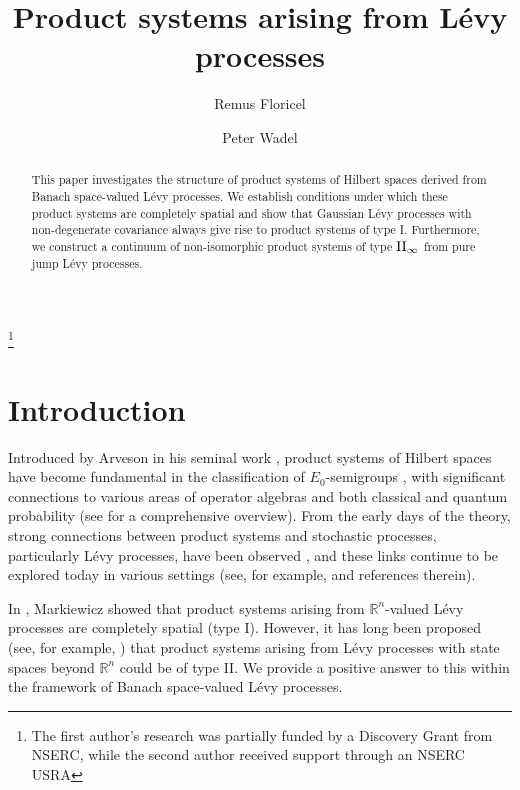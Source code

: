 \documentclass[11pt]{amsart}
\theoremstyle{definition}
\theoremstyle{remark}
\numberwithin{equation}{section}
\begin{document}
\title{Product systems arising from L\'evy processes}

\author{Remus Floricel}
\author{Peter Wadel}
\address{University of Regina, Department of Mathematics and Statistics, Regina, SK, Canada}
\address{University of Waterloo, Faculty of Mathematics, Waterloo, ON, Canada}
\thanks{The first author's research was partially funded by a Discovery Grant from NSERC, while the second author received support through an NSERC USRA}

\begin{abstract}
This paper investigates the structure of product systems of Hilbert spaces derived from Banach space-valued L\'evy processes. We establish conditions under which these product systems are completely spatial and show that Gaussian L\'evy processes with non-degenerate covariance always give rise to product systems of type I. Furthermore, we construct a continuum of non-isomorphic product systems of type \(\rm{II}\sb\infty\) from pure jump L\'evy processes. 
\end{abstract}




\maketitle
\section{Introduction}

Introduced by Arveson in his seminal work \cite{A2}, product systems of Hilbert spaces have become fundamental in the classification of \(E_0\)-semigroups \cite{Pow88}, with significant connections to various areas of operator algebras and both classical and quantum probability (see \cite{A7} for a comprehensive overview). From the early days of the theory, strong connections between product systems and stochastic processes, particularly L\'evy processes, have been observed \cite{Mey, Mar0, Tsirelson2002}, and these links continue to be explored today in various settings (see, for example, \cite{Tsirelson2004, Liebscher, Skeide, Sundar} and references therein).

In \cite{Mar0, Mar1}, Markiewicz showed that product systems arising from \(\mathbb{R}^n\)-valued L\'evy processes are completely spatial (type I). However, it has long been proposed (see, for example, \cite{Skeide}) that product systems arising from L\'evy processes with state spaces beyond \(\mathbb{R}^n\) could be of type II. We provide a positive answer to this within the framework of Banach space-valued L\'evy processes.
\end{document}
